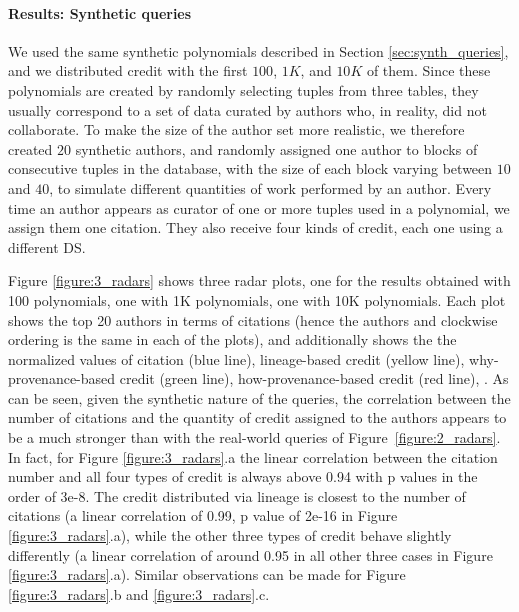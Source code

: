 \paragraph{Results: Synthetic queries}
We used the same synthetic polynomials described in Section \ref{sec:synth_queries}, and we distributed credit with the first $100$, $1K$, and $10K$ of them.
Since these polynomials are created by randomly selecting tuples from three tables, they usually correspond to a set of data curated by  authors who, in reality, did not collaborate. To make the size of the author set more realistic, we therefore created $20$ synthetic authors, and randomly assigned one author to blocks of consecutive tuples in the database, with the size of each block varying between $10$ and $40$, to simulate different quantities of work performed by an author. 
Every time an author appears as curator of one or more tuples used in a polynomial, we assign them one citation.  
They also receive four kinds of credit, each one using a different DS.

Figure \ref{figure:3_radars} shows three radar plots, one for the results obtained with 100 polynomials, one with 1K polynomials, one with 10K polynomials.  
Each plot shows the top 20 authors in terms of citations (hence the authors and clockwise ordering is the same in each of the plots), and additionally shows the the normalized values of citation (blue line), lineage-based credit (yellow line), why-provenance-based credit (green line), how-provenance-based  credit (red line), . 
As can be seen, given the synthetic nature of the queries, the correlation between the number of citations and the quantity of credit assigned to the authors appears to be a much stronger than with the real-world queries of Figure~\ref{figure:2_radars}. In fact, for Figure \ref{figure:3_radars}.a  the linear correlation between the citation number and all four types of credit is always above 0.94 with p values in the order of 3e-8.
The credit distributed via lineage is closest to  the number of citations (a linear correlation of 0.99, p value of 2e-16 in Figure \ref{figure:3_radars}.a), while the other three types of credit behave slightly differently (a linear correlation of around 0.95 in all other three cases in Figure \ref{figure:3_radars}.a).  
Similar observations can be made for Figure \ref{figure:3_radars}.b and \ref{figure:3_radars}.c.

